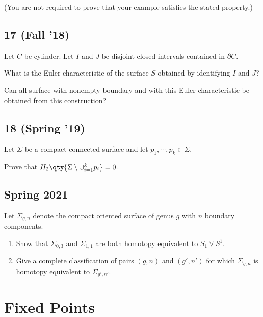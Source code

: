 (You are not required to prove that your example satisfies the stated
property.)

\hypertarget{fall-18-8}{%
\subsection{17 (Fall '18)}\label{fall-18-8}}

Let \(C\) be cylinder. Let \(I\) and \(J\) be disjoint closed intervals
contained in \(\partial C\).

What is the Euler characteristic of the surface \(S\) obtained by
identifying \(I\) and \(J\)?

Can all surface with nonempty boundary and with this Euler
characteristic be obtained from this construction?

\hypertarget{spring-19-4}{%
\subsection{18 (Spring '19)}\label{spring-19-4}}

Let \(\Sigma\) be a compact connected surface and let
\(p_1, \cdots , p_k \in \Sigma\).

Prove that \(H_2 \qty{\Sigma \setminus \cup_{i=1}^k {p_i} } = 0\).

\hypertarget{spring-2021}{%
\subsection{Spring 2021}\label{spring-2021}}

\begin{problem}[Spring 2021, 8]

Let \(\Sigma_{g, n}\) denote the compact oriented surface of genus \(g\)
with \(n\) boundary components.

\begin{enumerate}
\def\labelenumi{\alph{enumi}.}
\item
  Show that \(\Sigma_{0, 3}\) and \(\Sigma_{1, 1}\) are both homotopy
  equivalent to \(S_1 \vee S^1\).
\item
  Give a complete classification of pairs \((g, n)\) and \((g', n')\)
  for which \(\Sigma_{g, n}\) is homotopy equivalent to
  \(\Sigma_{g', n'}\).
\end{enumerate}

\end{problem}

\hypertarget{fixed-points}{%
\section{Fixed Points}\label{fixed-points}}

